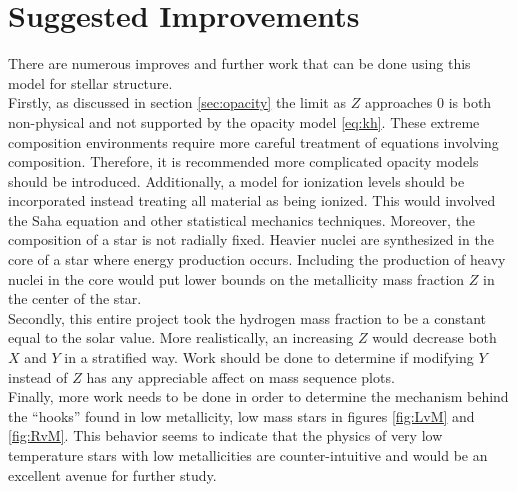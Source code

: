 \documentclass[11pt]{article}
\begin{document}
    \section{Suggested Improvements}
    There are numerous improves and further work that can be done using this model for stellar structure. \\

    Firstly, as discussed in section \ref{sec:opacity} the limit as $Z$ approaches $0$ is both non-physical and not supported by the opacity model \eqref{eq:kh}. These extreme composition environments require more careful treatment of equations involving composition. Therefore, it is recommended more complicated opacity models should be introduced. Additionally, a model for ionization levels should be incorporated instead treating all material as being ionized. This would involved the Saha equation and other statistical mechanics techniques. Moreover, the composition of a star is not radially fixed. Heavier nuclei are synthesized in the core of a star where energy production occurs. Including the production of heavy nuclei in the core would put lower bounds on the metallicity mass fraction $Z$ in the center of the star. \\

    Secondly, this entire project took the hydrogen mass fraction to be a constant equal to the solar value. More realistically, an increasing $Z$ would decrease both $X$ and $Y$ in a stratified way. Work should be done to determine if modifying $Y$ instead of $Z$ has any appreciable affect on mass sequence plots. \\

    Finally, more work needs to be done in order to determine the mechanism behind the ``hooks'' found in low metallicity, low mass stars in figures \ref{fig:LvM} and \ref{fig:RvM}. This behavior seems to indicate that the physics of very low temperature stars with low metallicities are counter-intuitive and would be an excellent avenue for further study.
    {}
    
\end{document}
